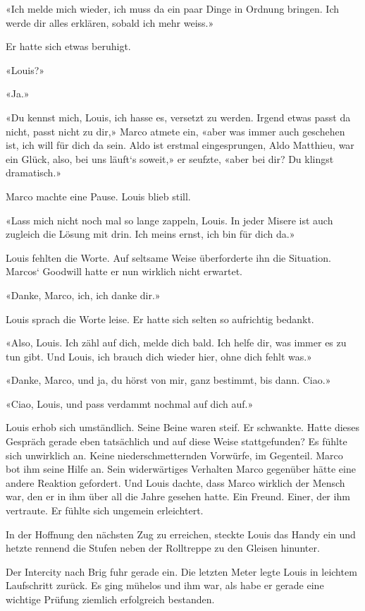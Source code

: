 «Ich melde mich wieder, ich muss da ein paar Dinge in Ordnung bringen.
Ich werde dir alles erklären, sobald ich mehr weiss.»

Er hatte sich etwas beruhigt.

«Louis?»

«Ja.»

«Du kennst mich, Louis, ich hasse es, versetzt zu werden. Irgend etwas
passt da nicht, passt nicht zu dir,» Marco atmete ein, «aber was immer
auch geschehen ist, ich will für dich da sein. Aldo ist erstmal
eingesprungen, Aldo Matthieu, war ein Glück, also, bei uns läuft`s
soweit,» er seufzte, «aber bei dir? Du klingst dramatisch.»

Marco machte eine Pause. Louis blieb still.

«Lass mich nicht noch mal so lange zappeln, Louis. In jeder Misere ist
auch zugleich die Lösung mit drin. Ich meins ernst, ich bin für dich
da.»

Louis fehlten die Worte. Auf seltsame Weise überforderte ihn die
Situation. Marcos` Goodwill hatte er nun wirklich nicht erwartet.

«Danke, Marco, ich, ich danke dir.»

Louis sprach die Worte leise. Er hatte sich selten so aufrichtig
bedankt.

«Also, Louis. Ich zähl auf dich, melde dich bald. Ich helfe dir, was
immer es zu tun gibt. Und Louis, ich brauch dich wieder hier, ohne dich
fehlt was.»

«Danke, Marco, und ja, du hörst von mir, ganz bestimmt, bis dann. Ciao.»

«Ciao, Louis, und pass verdammt nochmal auf dich auf.»

Louis erhob sich umständlich. Seine Beine waren steif. Er schwankte.
Hatte dieses Gespräch gerade eben tatsächlich und auf diese Weise
stattgefunden? Es fühlte sich unwirklich an. Keine niederschmetternden
Vorwürfe, im Gegenteil. Marco bot ihm seine Hilfe an. Sein widerwärtiges
Verhalten Marco gegenüber hätte eine andere Reaktion gefordert. Und
Louis dachte, dass Marco wirklich der Mensch war, den er in ihm über all
die Jahre gesehen hatte. Ein Freund. Einer, der ihm vertraute. Er fühlte
sich ungemein erleichtert.

In der Hoffnung den nächsten Zug zu erreichen, steckte Louis das Handy
ein und hetzte rennend die Stufen neben der Rolltreppe zu den Gleisen
hinunter.

Der Intercity nach Brig fuhr gerade ein. Die letzten Meter legte Louis
in leichtem Laufschritt zurück. Es ging mühelos und ihm war, als habe er
gerade eine wichtige Prüfung ziemlich erfolgreich bestanden.

